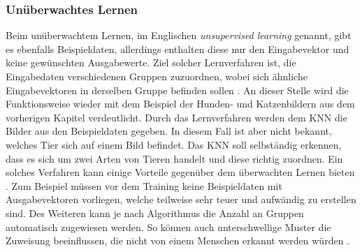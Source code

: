 \subsubsection{Unüberwachtes Lernen}
\label{subsubsec:unsupervised_learning}
Beim unüberwachtem Lernen, im Englischen \emph{unsupervised learning} genannt, gibt es ebenfalls Beispieldaten, allerdings enthalten diese nur den Eingabevektor und keine gewünschten Ausgabewerte. Ziel solcher Lernverfahren ist, die Eingabedaten verschiedenen Gruppen zuzuordnen, wobei sich ähnliche Eingabevektoren in derselben Gruppe befinden sollen \cite{zell2003simulation}. An dieser Stelle wird die Funktionsweise wieder mit dem Beispiel der Hunden- und Katzenbildern aus dem vorherigen Kapitel verdeutlicht. Durch das Lernverfahren werden dem \ac{KNN} die Bilder aus den Beispieldaten gegeben. In diesem Fall ist aber nicht bekannt, welches Tier sich auf einem Bild befindet. Das \ac{KNN} soll selbständig erkennen, dass es sich um zwei Arten von Tieren handelt und diese richtig zuordnen. Ein solches Verfahren kann einige Vorteile gegenüber dem überwachten Lernen bieten \cite{mahmad2005IEEE}. Zum Beispiel müssen vor dem Training keine Beispieldaten mit Ausgabevektoren vorliegen, welche teilweise sehr teuer und aufwändig zu erstellen sind. Des Weiteren kann je nach Algorithmus die Anzahl an Gruppen automatisch zugewiesen werden. So können auch unterschwellige Muster die Zuweisung beeinflussen, die nicht von einem Menschen erkannt werden würden \cite{mahmad2005IEEE}.
 
